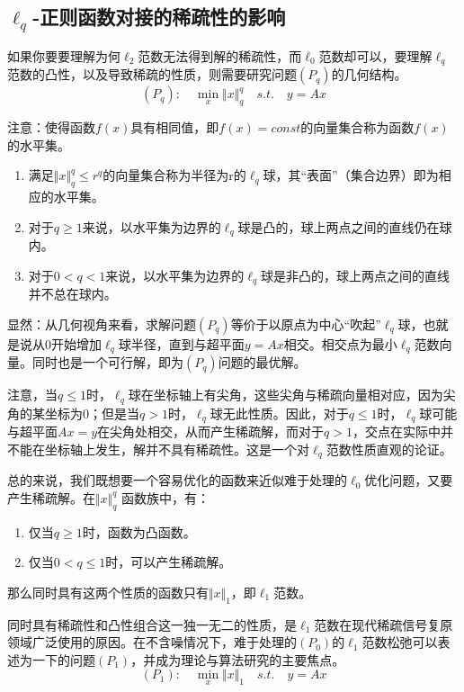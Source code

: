 \subsection{$\ell_q$-正则函数对接的稀疏性的影响}

{\heiti 如果你要要理解为何$ \ell_2 $范数无法得到解的稀疏性，而$ \ell_0 $范数却可以，要理解$ \ell_q $范数的凸性，以及导致稀疏的性质，则需要研究问题$ (P_q) $的几何结构。}
\begin{equation}\label{key}
(P_q):\quad  \min_{x} \Vert x \Vert_q^q \quad s.t. \quad y =Ax
\end{equation}

注意：{\heiti 	使得函数$ f(x) $具有相同值，即$ f(x)=const $的向量集合称为函数$ f(x) $的水平集。}
\begin{enumerate}
	\item 满足$ \Vert x\Vert_q^q \leq r^q $的向量集合称为半径为r的$\ell_q $球，其“表面”（集合边界）即为相应的水平集。
	\item 对于$ q\geq 1 $来说，以水平集为边界的$\ell_q $球是凸的，球上两点之间的直线仍在球内。
	\item 对于$ 0< q< 1 $来说，以水平集为边界的$\ell_q $球是非凸的，球上两点之间的直线并不总在球内。
\end{enumerate}

显然：{\heiti 	从几何视角来看，求解问题$ (P_q) $等价于以原点为中心“吹起”$ \ell_q $球，也就是说从0开始增加$ \ell_q $球半径，直到与超平面$ y=Ax $相交。相交点为最小$ \ell_q $范数向量。同时也是一个可行解，即为$ (P_q) $问题的最优解。}

注意，当$ q\leq 1 $时，$ \ell_q $球在坐标轴上有尖角，这些尖角与稀疏向量相对应，因为尖角的某坐标为0；但是当$ q>1 $时，$ \ell_q $球无此性质。因此，{\heiti 对于$ q\leq 1 $时，$ \ell_q $球可能与超平面$ Ax=y $在尖角处相交，从而产生稀疏解}，而对于$ q>1 $，交点在实际中并不能在坐标轴上发生，解并不具有稀疏性。这是一个对$ \ell_q $范数性质直观的论证。

总的来说，我们既想要一个容易优化的函数来近似难于处理的$ \ell_0 $优化问题，又要产生稀疏解。在$\Vert x\Vert_q^q $ 函数族中，有：
\begin{enumerate}
	\item 仅当$ q\geq 1 $时，函数为凸函数。
	\item 仅当$ 0<q\leq 1 $时，可以产生稀疏解。
\end{enumerate}
\par 那么同时具有这两个性质的函数只有$\Vert x\Vert_1 $，即$ \ell_1 $范数。

同时具有稀疏性和凸性组合这一独一无二的性质，是$ \ell_1 $范数在现代稀疏信号复原领域广泛使用的原因。在不含噪情况下，难于处理的$ (P_0) $的$ \ell_1 $范数松弛可以表述为一下的问题$ (P_1) $，并成为理论与算法研究的主要焦点。
\begin{equation}\label{key}
(P_1):\quad  \min_{x} \Vert x \Vert_1 \quad s.t. \quad y =Ax
\end{equation}
